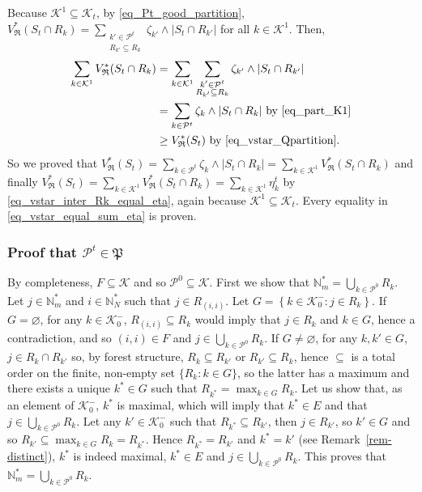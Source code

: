 \documentclass[
  11pt,
  a4paper,
]{article}
\theoremstyle{plain}
\theoremstyle{plain}
\theoremstyle{definition}
\theoremstyle{plain}
\theoremstyle{definition}
\theoremstyle{remark}
\begin{document}
Because \(\mathcal{K}^1\subseteq\mathcal{K}_t\), by
\eqref{eq_Pt_good_partition},
\(V^*_{\mathfrak{R}}(S_t\cap R_k) = \sum_{\substack{k'\in \mathcal{P}^t\\ R_{k'}\subseteq R_k}} \zeta_{k'}\wedge|S_t \cap R_{k'}|\)
for all \(k\in\mathcal{K}^1\). Then, \begin{align*}
 \sum_{k\in\mathcal{K}^1} V^*_{\mathfrak{R}}(S_t\cap R_k)&=  \sum_{k\in\mathcal{K}^1}\sum_{\substack{k'\in \mathcal{P}^t\\ R_{k'}\subseteq R_k}} \zeta_{k'}\wedge|S_t \cap R_{k'}|\\
 &=\sum_{k\in\mathcal{P}^t} \zeta_{k}\wedge |S_t\cap R_{k}| \text{ by \eqref{eq_part_K1}}\\
 &\geq V^*_{\mathfrak{R}}(S_t) \text{ by \eqref{eq_vstar_Qpartition}}.\\
\end{align*} So we proved that
\(V^*_{\mathfrak{R}}(S_t)= \sum_{k\in\mathcal{P}^t} \zeta_{k}\wedge |S_t\cap R_{k}|= \sum_{k\in\mathcal{K}^1} V^*_{\mathfrak{R}}(S_t\cap R_k)\)
and finally
\(V^*_{\mathfrak{R}}(S_t)=\sum_{k\in\mathcal{K}^1} V^*_{\mathfrak{R}}(S_t\cap R_k)= \sum_{k\in\mathcal{K}^1}  \eta_k^t\)
by \eqref{eq_vstar_inter_Rk_equal_eta}, again because
\(\mathcal{K}^1\subseteq\mathcal{K}_t\). Every equality in
\eqref{eq_vstar_equal_sum_eta} is proven.

\subsubsection{\texorpdfstring{Proof that
\(\mathcal{P}^t\in\mathfrak P\)}{Proof that \textbackslash mathcal\{P\}\^{}t\textbackslash in\textbackslash mathfrak P}}\label{proof-that-mathcalptinmathfrak-p}

By completeness, \(F\subseteq \mathcal{K}\) and so
\(\mathcal{P}^0\subseteq \mathcal{K}\). First we show that
\(\mathbb{N}_m^*=\bigcup_{k\in\mathcal{P}^0}R_k\). Let
\(j\in\mathbb{N}_m^*\) and \(i\in \mathbb{N}_N^*\) such that
\(j\in R_{(i,i)}\). Let
\(G=\left\{k\in\mathcal{K}_0^-: j\in R_k\right\}\). If
\(G=\varnothing\), for any \(k\in\mathcal{K}_0^-\),
\(R_{(i,i)}\subseteq R_k\) would imply that \(j\in R_k\) and \(k\in G\),
hence a contradiction, and so \((i,i)\in F\) and
\(j\in \bigcup_{k\in\mathcal{P}^0}R_k\). If \(G\neq\varnothing\), for
any \(k,k'\in G\), \(j\in R_{k}\cap R_{k'}\) so, by forest structure,
\(R_{k}\subseteq R_{k'}\) or \(R_{k'}\subseteq R_{k}\), hence
\(\subseteq\) is a total order on the finite, non-empty set
\(\{R_k : k\in G\}\), so the latter has a maximum and there exists a
unique \(k^*\in G\) such that \(R_{k^*}=\max_{k\in G}R_k\). Let us show
that, as an element of \(\mathcal{K}_0^-\), \(k^*\) is maximal, which
will imply that \(k^*\in E\) and that
\(j\in \bigcup_{k\in\mathcal{P}^0}R_k\). Let any
\(k'\in \mathcal{K}_0^-\) such that \(R_{k^*}\subseteq R_{k'}\), then
\(j\in R_{k'}\), so \(k'\in G\) and so
\(R_{k'}\subseteq \max_{k\in G}R_k=R_{k^*}\). Hence \(R_{k^*}= R_{k'}\)
and \(k^*=k'\) (see Remark~\ref{rem-distinct}), \(k^*\) is indeed
maximal, \(k^*\in E\) and \(j\in \bigcup_{k\in\mathcal{P}^0}R_k\). This
proves that \(\mathbb{N}_m^*=\bigcup_{k\in\mathcal{P}^0}R_k\).
\end{document}
